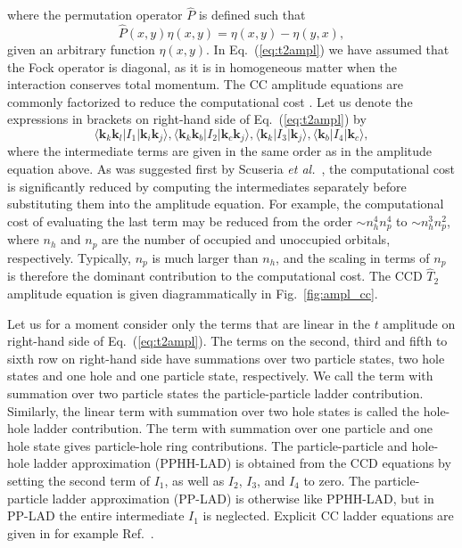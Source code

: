 \documentclass[a4paper,12pt]{report}
\begin{document}
where the permutation operator $\hat{P}$ is defined such that
\begin{equation}
  \hat{P}(x, y)\eta(x, y) = \eta(x, y) - \eta(y, x),
  \label{eq:perm}
\end{equation}
given an arbitrary function $\eta(x, y)$. In Eq.~(\ref{eq:t2ampl}) we have 
assumed that the Fock operator is diagonal, as it is in homogeneous matter
when the interaction conserves total momentum. The CC amplitude equations
are commonly factorized to reduce the computational cost \cite{crawford}.
Let us denote the expressions in brackets on right-hand side of 
Eq.~(\ref{eq:t2ampl}) by
\[
\langle \mathbf{k}_{k}\mathbf{k}_{l}|I_{1}|\mathbf{k}_{i}\mathbf{k}_{j}\rangle ,
\langle \mathbf{k}_{k}\mathbf{k}_{b}|I_{2}|\mathbf{k}_{c}\mathbf{k}_{j}\rangle ,
\langle \mathbf{k}_{k}|I_{3}|\mathbf{k}_{j}\rangle , 
\langle \mathbf{k}_{b}|I_{4}|\mathbf{k}_{c} \rangle ,
\]
where the intermediate terms are given in the same order as in the amplitude 
equation above. As was suggested first by Scuseria 
\emph{et al.}~\cite{scuseria_1988}, the computational 
cost is significantly reduced by computing the intermediates separately
before substituting them into the amplitude equation. For example,
the computational cost of evaluating the last term may be reduced from
the order $\sim n_{h}^{4}n_{p}^{4}$ to $\sim n_{h}^{3}n_{p}^{2}$, where $n_{h}$ 
and $n_{p}$ are the number of occupied and unoccupied orbitals, respectively. 
Typically, $n_{p}$ is much larger than $n_{h}$, and the scaling in terms 
of $n_{p}$ is therefore the dominant contribution to the computational cost.  
The CCD $\hat{T}_{2}$ amplitude equation is given diagrammatically in 
Fig.~\ref{fig:ampl_cc}. 

Let us for a moment consider only the terms that are linear in the 
$t$ amplitude on right-hand side of Eq.~(\ref{eq:t2ampl}). The terms 
on the second, third and fifth to sixth row on right-hand side  
have summations over two particle states, two hole states and
one hole and one particle state, respectively. We call the term with
summation over two particle states the particle-particle ladder
contribution. 
Similarly, the linear term with summation over two hole
states is called the hole-hole ladder contribution. The term with 
summation over one particle and one hole state gives particle-hole
ring contributions. The particle-particle and hole-hole ladder 
approximation (PPHH-LAD) is obtained from the CCD equations by setting 
the second term of $I_{1}$, as well as $I_{2}$, $I_{3}$, and $I_{4}$ to zero. 
The particle-particle ladder approximation (PP-LAD) is otherwise like 
PPHH-LAD, but in PP-LAD the entire intermediate $I_{1}$ is neglected. 
Explicit CC ladder equations are given in for example Ref.~\cite{baardsen}.
\end{document}
